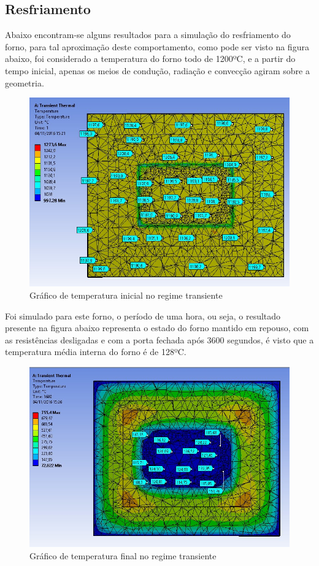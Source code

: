 \subsection{Resfriamento}
Abaixo encontram-se alguns resultados para a simulação do resfriamento do forno,
para tal aproximação deste comportamento, como pode ser visto na figura abaixo, foi
considerado a temperatura do forno todo de 1200ºC, e a partir do tempo inicial, apenas os
meios de condução, radiação e convecção agiram sobre a geometria.
\begin{figure}[H]
	\centering
	\label{ansys12}
	\includegraphics[keepaspectratio=true,scale=0.8]{figuras/ansys12.jpg}
    \caption{Gráfico de temperatura inicial no regime transiente}
\end{figure}

Foi simulado para este forno, o período de uma hora, ou seja, o resultado presente na figura
abaixo representa o estado do forno mantido em repouso, com as resistências desligadas e com a
porta fechada após 3600 segundos, é visto que a temperatura média interna do forno é de 128ºC.
\begin{figure}[H]
	\centering
	\label{ansys13}
	\includegraphics[keepaspectratio=true,scale=0.65]{figuras/ansys13.jpg}
    \caption{Gráfico de temperatura final no regime transiente}
\end{figure}

